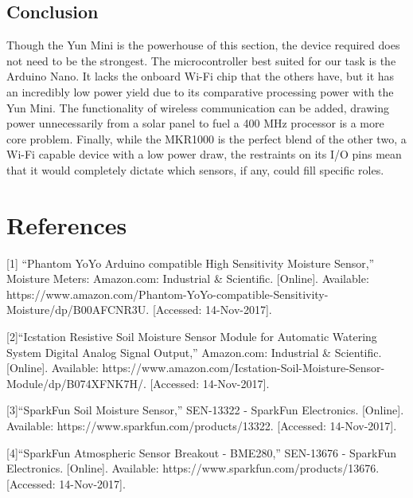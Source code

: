 \documentclass[IEEEtran,letterpaper,10pt,titlepage,fleqn,draftclsnofoot,onecolumn]{article}
\begin{document}
\subsection{Conclusion}

Though the Yun Mini is the powerhouse of this section, the device required does not need to be the strongest. The microcontroller best suited for our task is the Arduino Nano. It lacks the onboard Wi-Fi chip that the others have, but it has an incredibly low power yield due to its comparative processing power with the Yun Mini. The functionality of wireless communication can be added, drawing power unnecessarily from a solar panel to fuel a 400 MHz processor is a more core problem. Finally, while the MKR1000 is the perfect blend of the other two, a Wi-Fi capable device with a low power draw, the restraints on its I/O pins mean that it would completely dictate which sensors, if any, could fill specific roles.

\clearpage

\section{References}
[1] “Phantom YoYo Arduino compatible High Sensitivity Moisture Sensor,” Moisture Meters: Amazon.com: Industrial \& Scientific. [Online]. Available: https://www.amazon.com/Phantom-YoYo-compatible-Sensitivity-Moisture/dp/B00AFCNR3U. [Accessed: 14-Nov-2017].

\vspace{1mm}

[2]“Icstation Resistive Soil Moisture Sensor Module for Automatic Watering System Digital Analog Signal Output,” Amazon.com: Industrial \& Scientific. [Online]. Available: https://www.amazon.com/Icstation-Soil-Moisture-Sensor-Module/dp/B074XFNK7H/. [Accessed: 14-Nov-2017].

\vspace{1mm}

[3]“SparkFun Soil Moisture Sensor,” SEN-13322 - SparkFun Electronics. [Online]. Available: https://www.sparkfun.com/products/13322. [Accessed: 14-Nov-2017].

\vspace{1mm}

[4]“SparkFun Atmospheric Sensor Breakout - BME280,” SEN-13676 - SparkFun Electronics. [Online]. Available: https://www.sparkfun.com/products/13676. [Accessed: 14-Nov-2017].

\vspace{1mm}
\end{document}
